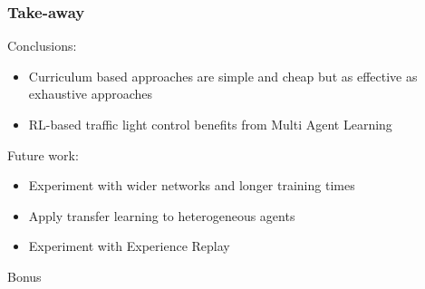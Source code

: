 \documentclass[dvipsnames]{beamer}
\begin{document}
\begin{frame}
  \frametitle{Take-away}
  Conclusions:
  \begin{itemize}
    \item Curriculum based approaches are simple and cheap but as effective as exhaustive approaches
    \item RL-based traffic light control benefits from Multi Agent Learning
  \end{itemize}

  Future work:
  \begin{itemize}
    \item Experiment with wider networks and longer training times
    \item Apply transfer learning to heterogeneous agents
    \item Experiment with Experience Replay
  \end{itemize}
\end{frame}

\begin{frame}
\centering
\Huge
Bonus
\end{frame}
\end{document}
